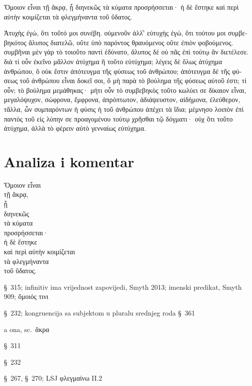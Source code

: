 {\large

\begin{greek}

\noindent Ὅμοιον εἶναι τῇ ἄκρᾳ, ᾗ διηνεκῶς τὰ κύματα προσρήσσεται· ἡ δὲ ἕστηκε καὶ περὶ αὐτὴν κοιμίζεται τὰ φλεγμήναντα τοῦ ὕδατος. 

\noindent Ἀτυχὴς ἐγώ, ὅτι τοῦτό μοι συνέβη. οὐμενοῦν ἀλλ̓' εὐτυχὴς ἐγώ, ὅτι τούτου μοι συμβεβηκότος ἄλυπος διατελῶ, οὔτε ὑπὸ παρόντος θραυόμενος οὔτε ἐπιὸν φοβούμενος. συμβῆναι μὲν γὰρ τὸ τοιοῦτο παντὶ ἐδύνατο, ἄλυπος δὲ οὐ πᾶς ἐπὶ τούτῳ ἂν διετέλεσε. διὰ τί οὖν ἐκεῖνο μᾶλλον ἀτύχημα ἢ τοῦτο εὐτύχημα; λέγεις δὲ ὅλως ἀτύχημα ἀνθρώπου, ὃ οὐκ ἔστιν ἀπότευγμα τῆς φύσεως τοῦ ἀνθρώπου; ἀπότευγμα δὲ τῆς φύσεως τοῦ ἀνθρώπου εἶναι δοκεῖ σοι, ὃ μὴ παρὰ τὸ βούλημα τῆς φύσεως αὐτοῦ ἐστι; τί οὖν; τὸ βούλημα μεμάθηκας· μήτι οὖν τὸ συμβεβηκὸς τοῦτο κωλύει σε δίκαιον εἶναι, μεγαλόψυχον, σώφρονα, ἔμφρονα, ἀπρόπτωτον, ἀδιάψευστον, αἰδήμονα, ἐλεύθερον, τἄλλα, ὧν συμπαρόντων ἡ φύσις ἡ τοῦ ἀνθρώπου ἀπέχει τὰ ἴδια; μέμνησο λοιπὸν ἐπὶ παντὸς τοῦ εἰς λύπην σε προαγομένου τούτῳ χρῆσθαι τῷ δόγματι· οὐχ ὅτι τοῦτο ἀτύχημα, ἀλλὰ τὸ φέρειν αὐτὸ γενναίως εὐτύχημα.

\end{greek}

}


\section*{Analiza i komentar}


{\large
\begin{greek}
\noindent  Ὅμοιον εἶναι \\
\tabto{2em} τῇ ἄκρᾳ, \\
\tabto{4em} ᾗ \\
\tabto{6em} διηνεκῶς \\
\tabto{4em} τὰ κύματα \\
\tabto{4em} προσρήσσεται· \\
ἡ δὲ ἕστηκε \\
καὶ περὶ αὐτὴν κοιμίζεται \\
\tabto{2em} τὰ φλεγμήναντα \\
\tabto{4em} τοῦ ὕδατος. \\

\end{greek}
}

\begin{description}[noitemsep]
\item[ Ὅμοιον εἶναι] §~315; infinitiv ima vrijednost zapovijedi, Smyth 2013; imenski predikat, Smyth 909; \textgreek[variant=ancient]{ὅμοιός τινι}
\item[προσρήσσεται] §~232; kongruencija sa subjektom u pluralu srednjeg roda §~361
\item[ἡ δὲ] a ona, sc.\ ἄκρα
\item[ἕστηκε] §~311
\item[κοιμίζεται] §~232
\item[τὰ φλεγμήναντα] §~267, §~270; LSJ φλεγμαίνω II.2

\end{description}

